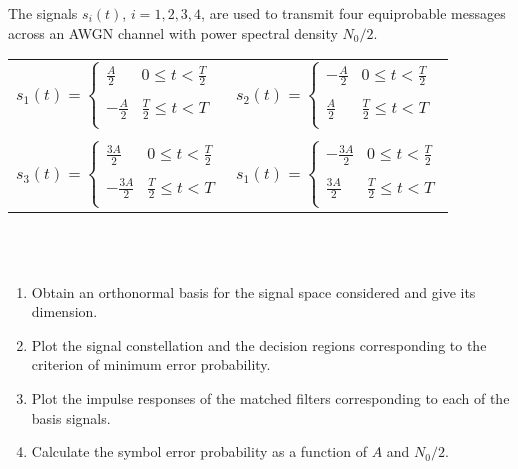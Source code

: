 \documentclass[idioma,boletin]{uah}
\begin{document}
{

	The signals $s_i(t)$, $i=1,2,3,4$, are used to transmit four equiprobable messages across an AWGN channel with power spectral density $N_0/2$. 
	\ \\
	
	\begin{tabular}[h!]{ll}
	$ s_1(t) = \left \{
		\begin{array}{ll}
			\frac{A}{2} & 0 \leq t <\frac{T}{2} \\
			& \\
			-\frac{A}{2} & \frac{T}{2} \leq t < T \\
		\end{array} \right.$
	&
	$ s_2(t) = \left \{
		\begin{array}{ll}
			-\frac{A}{2} & 0 \leq t <\frac{T}{2} \\
			& \\
			\frac{A}{2} & \frac{T}{2} \leq t < T \\
		\end{array} \right.$ \\
		& \\
	$ s_3(t) = \left \{
		\begin{array}{ll}
			\frac{3A}{2} & 0 \leq t <\frac{T}{2} \\
			& \\
			-\frac{3A}{2} & \frac{T}{2} \leq t < T \\
		\end{array} \right.$
	&
	$ s_1(t) = \left \{
		\begin{array}{ll}
			-\frac{3A}{2} & 0 \leq t <\frac{T}{2} \\
			& \\
			\frac{3A}{2} & \frac{T}{2} \leq t < T \\
		\end{array} \right.$
	\end{tabular}
	\ \\
	\ \\
	\begin{enumerate}
		\item Obtain an orthonormal basis for the signal space considered and give its dimension.
		\item Plot the signal constellation and the decision regions corresponding to the criterion of minimum error probability.
		\item Plot the impulse responses of the matched filters corresponding to each of the basis signals.
		\item Calculate the symbol error probability as a function of $A$ and $N_0/2$.
	\end{enumerate}

}
\end{document}
